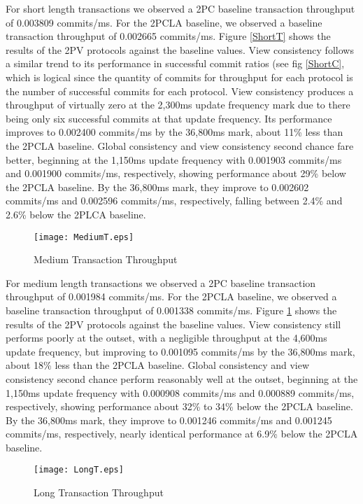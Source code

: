 \documentclass[11pt]{article}
\begin{document}
For short length transactions we observed a 2PC baseline transaction throughput of 0.003809 commits/ms. For the 2PCLA baseline, we observed a baseline transaction throughput of 0.002665 commits/ms. Figure \ref{ShortT} shows the results of the 2PV protocols against the baseline values. View consistency follows a similar trend to its performance in successful commit ratios (see fig \ref{ShortC}, which is logical since the quantity of commits for throughput for each protocol is the number of successful commits for each protocol. View consistency produces a throughput of virtually zero at the 2,300ms update frequency mark due to there being only six successful commits at that update frequency. Its performance improves to 0.002400 commits/ms by the 36,800ms mark, about 11\% less than the 2PCLA baseline. Global consistency and view consistency second chance fare better, beginning at the 1,150ms update frequency with 0.001903 commits/ms and 0.001900 commits/ms, respectively, showing performance about 29\% below the 2PCLA baseline. By the 36,800ms mark, they improve to 0.002602 commits/ms and 0.002596 commits/ms, respectively, falling between 2.4\% and 2.6\% below the 2PLCA baseline.
\begin{figure}[h]
\begin{center}
\texttt{[image: MediumT.eps]}
\caption{Medium Transaction Throughput}
\label{MediumT}
\end{center}
\end{figure}

For medium length transactions we observed a 2PC baseline transaction throughput of 0.001984 commits/ms. For the 2PCLA baseline, we observed a baseline transaction throughput of 0.001338 commits/ms. Figure \ref{MediumT} shows the results of the 2PV protocols against the baseline values. View consistency still performs poorly at the outset, with a negligible throughput at the 4,600ms update frequency, but improving to 0.001095 commits/ms by the 36,800ms mark, about 18\% less than the 2PCLA baseline. Global consistency and view consistency second chance perform reasonably well at the outset, beginning at the 1,150ms update frequency with 0.000908 commits/ms and 0.000889 commits/ms, respectively, showing performance about 32\% to 34\% below the 2PCLA baseline. By the 36,800ms mark, they improve to 0.001246 commits/ms and 0.001245 commits/ms, respectively, nearly identical performance at 6.9\% below the 2PCLA baseline.
\begin{figure}[h]
\begin{center}
\texttt{[image: LongT.eps]}
\caption{Long Transaction Throughput}
\label{LongT}
\end{center}
\end{figure}
\end{document}
